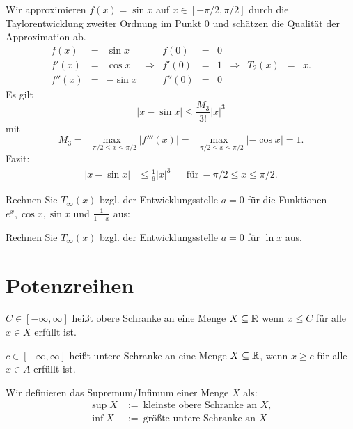 \begin{bsp} 
	Wir approximieren $f(x) = \sin x$ auf $x \in [-\pi/2,\pi/2]$ durch die Taylorentwicklung zweiter Ordnung im Punkt $0$ und schätzen die Qualität der Approximation ab. 
	\[
		\begin{array}{|ccc|c|ccc|cccc}
		f(x) & = & \sin x &  &  f(0) & = & 0 & \\ 
		f'(x)  & = & \cos x & \Longrightarrow & f'(0) & =   & 1 & \Longrightarrow & T_2(x) &  = & x. \\ 
		f''(x)  & =  & - \sin x &  &  f''(0) & = & 0 &
		\end{array} 
	\]
	Es gilt
	\[
		|x - \sin x| \le \frac{M_3}{3!} |x|^3
	\]
	mit 
	\[
		M_3 = \max_{-\pi/2 \le x \le \pi/ 2} | f'''(x) | = \max_{-\pi/2 \le x \le \pi / 2} | - \cos x| = 1.
	\]
	Fazit: 
	\begin{align*}
			|x - \sin x| & \le \frac{1}{6} |x|^3 & & \text{für} \ -\pi/2 \le x \le \pi/2. 
	\end{align*}
\end{bsp} 

\begin{aufg}
	Rechnen Sie $T_\infty(x)$ bzgl. der Entwicklungsstelle $a=0$ für die  Funktionen $e^x, \cos x, \sin x$ und $\frac{1}{1-x}$ aus: 
\end{aufg} 

\begin{aufg}
	Rechnen Sie $T_\infty(x)$ bzgl. der Entwicklungsstelle $a=0$ für $\ln x$ aus. 
\end{aufg} 



\section{Potenzreihen} 

\begin{defn} 
	$C \in [-\infty,\infty]$ heißt obere Schranke an eine Menge $X \subseteq \mathbb{R}$ wenn $x \le C$ für alle $x \in X$ erfüllt ist.
	
	$c \in [-\infty,\infty]$ heißt untere Schranke an eine Menge $X \subseteq \mathbb{R}$, wenn $x \ge c$ für alle $x \in A$ erfüllt ist. 
	
	Wir definieren das Supremum/Infimum einer Menge $X$ als:
	\begin{align*}
		\sup X & :=  \ \text{kleinste obere Schranke an $X$},
	\\	\inf X  & := \ \text{größte untere Schranke an $X$}
	\end{align*}
\end{defn} 

